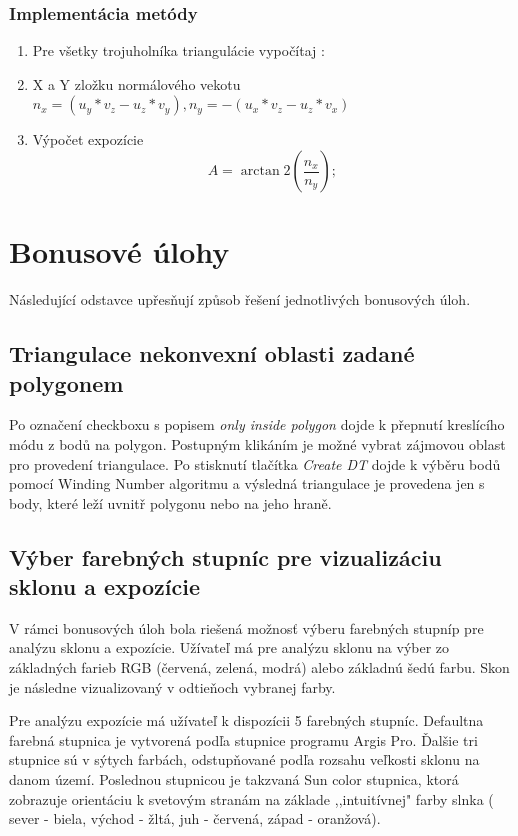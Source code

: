 \documentclass[12pt]{article}
\begin{document}
\subsubsection{Implementácia metódy}
\begin{enumerate}
	\item Pre všetky trojuholníka triangulácie vypočítaj : 
	\item X a Y zložku normálového vekotu $ n_x = (u_y * v_z - u_z * v_y) , n_y = - (u_x * v_z - u_z * v_x) $
	\item Výpočet expozície $$A = \arctan2(\frac{n_x}{n_y});$$

\end{enumerate}

\clearpage 
\section{Bonusové úlohy}
Následující odstavce upřesňují způsob řešení jednotlivých bonusových úloh.

\subsection{Triangulace nekonvexní oblasti zadané polygonem}
Po označení checkboxu s popisem \textit{only inside polygon} dojde k přepnutí kreslícího módu z  bodů na polygon. Postupným klikáním je možné vybrat zájmovou oblast pro provedení triangulace. Po stisknutí tlačítka \textit{Create DT} dojde k výběru bodů pomocí Winding Number algoritmu a výsledná triangulace je provedena jen s body, které leží uvnitř polygonu nebo na jeho hraně.

\subsection{Výber farebných stupníc pre vizualizáciu sklonu a expozície}
V rámci bonusových úloh bola riešená možnosť výberu farebných stupníp pre analýzu sklonu a expozície. Užívateľ má pre analýzu sklonu na výber zo základných farieb RGB (červená, zelená, modrá) alebo základnú šedú farbu. Skon je následne vizualizovaný v odtieňoch vybranej farby.

Pre analýzu expozície má užívateľ k dispozícii 5 farebných stupníc. Defaultna farebná stupnica je vytvorená podľa stupnice programu Argis Pro. Ďalšie tri stupnice sú v sýtych farbách, odstupňované podľa rozsahu veľkosti sklonu na danom území. Poslednou stupnicou je takzvaná Sun color stupnica, ktorá zobrazuje orientáciu k svetovým stranám na základe  ,,intuitívnej" farby slnka ( sever - biela, východ - žltá, juh - červená, západ - oranžová).
\end{document}
